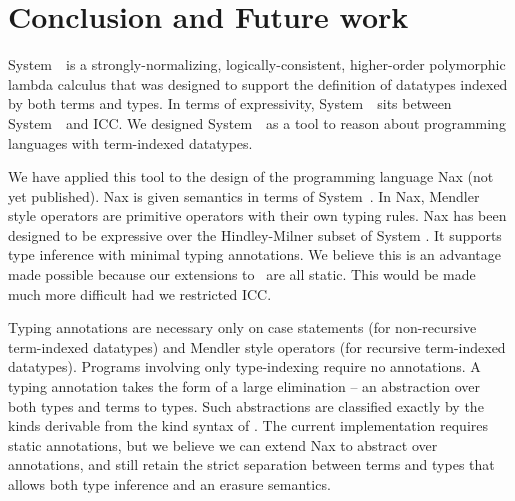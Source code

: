 \section{Conclusion and Future work}
\label{sec:concl}

System~\Fi\ is a strongly-normalizing, logically-consistent, higher-order
polymorphic lambda calculus that was designed to support the
definition of datatypes indexed by both terms and types.
In terms of expressivity, System~\Fi\ sits between System~\Fw\ and ICC.
We designed System~\Fi\ as a tool to reason about programming
languages with term-indexed datatypes. 

We have applied this tool to the design of the programming language Nax (not yet published).
Nax is given semantics in terms of System~\Fi . In Nax, Mendler style operators
are primitive operators with their own typing rules. Nax has been designed to
be expressive over the Hindley-Milner subset of System \Fi. It supports type
inference with minimal typing annotations. We believe this is an advantage
made possible because our extensions to \Fw\ are all static. This would be made
much more difficult had we restricted ICC.

Typing annotations are necessary only
on case statements (for non-recursive term-indexed datatypes)
and Mendler style operators (for recursive term-indexed datatypes).
Programs involving only type-indexing require no annotations.
A typing annotation takes the form of a large elimination --
an abstraction over both types and terms to types. Such abstractions
are classified exactly by the kinds derivable from the kind
syntax of \Fi.   The current implementation requires
static annotations, but we believe we can extend Nax to abstract over
annotations, and still retain the strict separation between terms and types
that allows both type inference and an erasure semantics.
 
